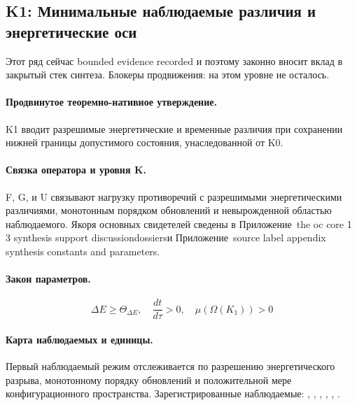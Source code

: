 \subsection{K1: Минимальные наблюдаемые различия и энергетические оси}
\label{sec:oc-core-1-3-synthesis-k1}
Этот ряд сейчас bounded evidence recorded и поэтому законно вносит вклад в закрытый стек синтеза.
Блокеры продвижения: на этом уровне не осталось.

\paragraph{Продвинутое теоремно-нативное утверждение.}
K1 вводит разрешимые энергетические и временные различия при сохранении нижней границы допустимого состояния, унаследованной от K0.

\paragraph{Связка оператора и уровня K.}
F, G, и U связывают нагрузку противоречий с разрешимыми энергетическими различиями, монотонным порядком обновлений и невырожденной областью наблюдаемого.
Якоря основных свидетелей сведены в Приложение~the oc core 1 3 synthesis support discussiondossiersи Приложение~source label appendix synthesis constants and parameters.

\paragraph{Закон параметров.}
\[
\Delta E \geq \Theta_{\Delta E},\quad \frac{dt}{d\tau} > 0,\quad \mu(\Omega(K_1)) > 0
\]

\paragraph{Карта наблюдаемых и единицы.}
Первый наблюдаемый режим отслеживается по разрешению энергетического разрыва, монотонному порядку обновлений и положительной мере конфигурационного пространства.
Зарегистрированные наблюдаемые: , \allowbreak {}, \allowbreak {}, \allowbreak {}, \allowbreak {}, \allowbreak {}.

